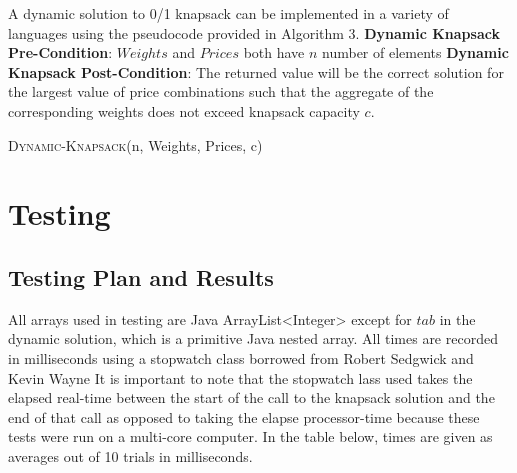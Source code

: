 \documentclass[onecolumn, 12pt, article]{IEEEtran}
\numberwithin{case}{problem}
\numberwithin{condition}{problem}
\numberwithin{condition}{subsection}
\numberwithin{definition}{section}
\theoremstyle{remark}
\numberwithin{question}{problem}
\theoremstyle{plain}
\numberwithin{answer}{problem}
\numberwithin{solution}{section}
\numberwithin{equation}{section}%
\begin{document}
A dynamic solution to 0/1 knapsack can be implemented in a variety of languages using the pseudocode provided in Algorithm 3.
\newline
\textbf{Dynamic Knapsack Pre-Condition}: $Weights$ and $Prices$ both have $n$ number of elements
\newline
\textbf{Dynamic Knapsack Post-Condition}: The returned value will be the correct solution for the largest value of price combinations such that the aggregate of the corresponding weights does not exceed knapsack capacity $c$.
\begin{algorithm}
\caption {\textsc{Dynamic-Knapsack}(n, Weights, Prices, c)}
\label{algo:dynamic}
\begin{algorithmic}[1]
\EndIf
{}
\EndIf
{}
	\EndFor
\EndFor
{}
		\EndIf
		\EndIf
	\EndFor
\EndFor
{}
\EndProcedure
\end{algorithmic}
\end{algorithm}
\newline
\newline
\newline


\section{Testing}
\subsection{Testing Plan and Results}
All arrays used in testing are Java ArrayList<Integer> except for $tab$ in the dynamic solution, which is a primitive Java nested array. All times are recorded in milliseconds using a stopwatch class borrowed from Robert Sedgwick and Kevin Wayne \cite{stopwatch}
It is important to note that the stopwatch lass used takes the elapsed real-time between the start of the call to the knapsack solution and the end of that call as opposed to taking the elapse processor-time because these tests were run on a multi-core computer.
In the table below, times are given as averages out of 10 trials in milliseconds.
\end{document}
